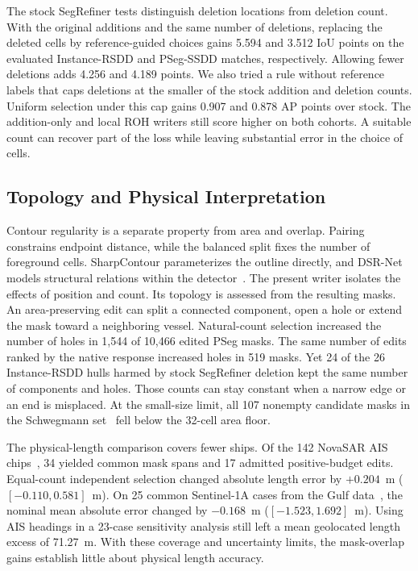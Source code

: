 \documentclass[journal]{IEEEtran}
\begin{document}
The stock SegRefiner tests distinguish deletion locations from deletion count. With the original additions and the same number of deletions, replacing the deleted cells by reference-guided choices gains 5.594 and 3.512 IoU points on the evaluated Instance-RSDD and PSeg-SSDD matches, respectively. Allowing fewer deletions adds 4.256 and 4.189 points. We also tried a rule without reference labels that caps deletions at the smaller of the stock addition and deletion counts. Uniform selection under this cap gains 0.907 and 0.878 AP points over stock. The addition-only and local ROH writers still score higher on both cohorts. A suitable count can recover part of the loss while leaving substantial error in the choice of cells.

\subsection{Topology and Physical Interpretation}

Contour regularity is a separate property from area and overlap. Pairing constrains endpoint distance, while the balanced split fixes the number of foreground cells. SharpContour parameterizes the outline directly, and DSR-Net models structural relations within the detector~\cite{sharpcontour,dsr}. The present writer isolates the effects of position and count. Its topology is assessed from the resulting masks.
An area-preserving edit can split a connected component, open a hole or extend the mask toward a neighboring vessel. Natural-count selection increased the number of holes in 1,544 of 10,466 edited PSeg masks. The same number of edits ranked by the native response increased holes in 519 masks. Yet 24 of the 26 Instance-RSDD hulls harmed by stock SegRefiner deletion kept the same number of components and holes. Those counts can stay constant when a narrow edge or an end is misplaced. At the small-size limit, all 107 nonempty candidate masks in the Schwegmann set~\cite{schwegmann} fell below the 32-cell area floor.

The physical-length comparison covers fewer ships. Of the 142 NovaSAR AIS chips~\cite{nastar}, 34 yielded common mask spans and 17 admitted positive-budget edits. Equal-count independent selection changed absolute length error by \(+0.204\)~m (\([-0.110,0.581]\)~m). On 25 common Sentinel-1A cases from the Gulf data~\cite{gulf}, the nominal mean absolute error changed by \(-0.168\)~m (\([-1.523,1.692]\)~m). Using AIS headings in a 23-case sensitivity analysis still left a mean geolocated length excess of 71.27~m. With these coverage and uncertainty limits, the mask-overlap gains establish little about physical length accuracy.
\end{document}
